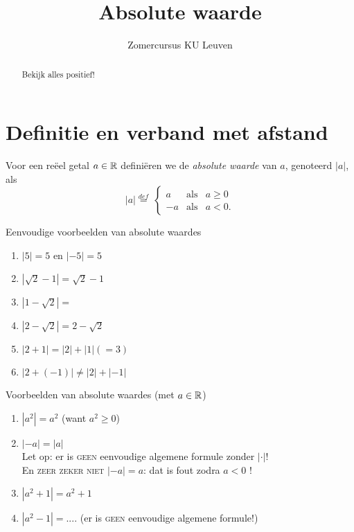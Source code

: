 \documentclass{ximera}
\author{Zomercursus KU Leuven}
\title[Rekenvaardigheden:]{Absolute waarde}
\begin{document}
\begin{abstract}
	Bekijk alles positief!
\end{abstract}
\maketitle

\section{Definitie en verband met afstand}\label{rv:sec:def}

\begin{definition}
	Voor een reëel getal $a\in\mathbb{R}$ definiëren we de \textit{absolute waarde} van $a$, genoteerd $|a|$, als
	\[
		|a| \overset{def}{=}\displaystyle\ 
		          \left\{
			\begin{array}{rll  } 
				a  & \mbox{als} & a \geq 0 \\
				-a & \mbox{als} & a<0.
			\end{array}\right.
	\]
\end{definition}

\begin{example} Eenvoudige voorbeelden van absolute waardes
	
		\begin{enumerate}
			\item $|5|=5$ en $|-5|=5$
			\item $|\sqrt{2}-1|=\sqrt{2} - 1$
			\item $|1-\sqrt{2}| = $
			\item $|2-\sqrt{2}| = 2 - \sqrt{2}$
			\item $|2 + 1| = |2| + | 1| (=3)$
			\item $|2 + (-1)| \neq |2| + | -1|$
		\end{enumerate}
\pdfOnly{\end{multicols}}
\end{example}
\begin{example} Voorbeelden van absolute waardes (met $a\in\mathbb{R}$)
		\begin{enumerate}[resume]
			\item $|a^2| = a^2$ (want $a^2 \geq 0$)
			\item $|-a|= |a|$ \\ Let op: er is \textsc{geen} eenvoudige algemene formule zonder $|\cdot|$! \\En \textsc{zeer zeker niet} $|-a|=a$: dat is fout zodra $a<0$ !
			\item $|a^2 + 1| = a^2 + 1$
			\item $|a^2 - 1| = ....$ \qquad(er is \textsc{geen} eenvoudige algemene formule!)
\end{enumerate}
\end{example}
\end{document}
